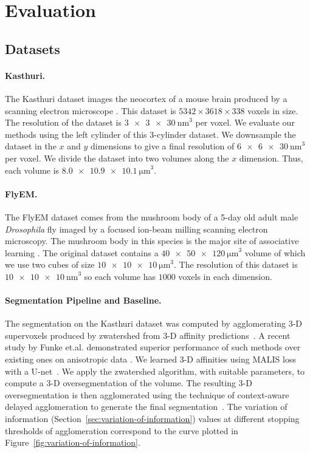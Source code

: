 \section{Evaluation}

\subsection{Datasets}
\label{sec:dataset}
\paragraph{Kasthuri.}
The Kasthuri dataset images the neocortex of a mouse brain produced by a scanning electron microscope \cite{kasthuri2015saturated}. 
This dataset is $5342 \times 3618 \times 338$ voxels in size. 
The resolution of the dataset is $\SI[product-units=single]{3 x 3 x 30}{\nano\meter}^3$ per voxel. 
We evaluate our methods using the left cylinder of this 3-cylinder dataset. 
We downsample the dataset in the $x$ and $y$ dimensions to give a final resolution of $\SI[product-units=single]{6 x 6 x 30}{\nano\meter}^3$ per voxel. 
We divide the dataset into two volumes along the $x$ dimension.
Thus, each volume is $\SI[product-units=single]{8.0 x 10.9 x 10.1}{\micro\meter}^3$. 

\paragraph{FlyEM.}
The FlyEM dataset comes from the mushroom body of a 5-day old adult male \textit{Drosophila} fly imaged by a focused ion-beam milling scanning electron microscopy.  
The mushroom body in this species is the major site of associative learning \cite{takemura2017connectome}. 
The original dataset contains a $\SI[product-units=single]{40 x 50 x 120}{\micro\meter}^3$ volume of which we use two cubes of size $\SI[product-units=single]{10 x 10 x 10}{\micro\meter}^3$. 
The resolution of this dataset is $\SI[product-units=single]{10 x 10 x 10}{\nano\meter}^3$ so each volume has $1000$ voxels in each dimension.

\paragraph{Segmentation Pipeline and Baseline.}
\label{sec:neuroproof}
The segmentation on the Kasthuri dataset was computed by agglomerating 3-D supervoxels produced by zwatershed from 3-D affinity predictions~\cite{zlateski2015image}. 
A recent study by Funke et.al. demonstrated superior performance of such methods over existing ones on anisotropic data \cite{schlegel2017learning}. 
We learned 3-D affinities using MALIS loss with a U-net~\cite{Turaga:2009,ronneberger2015u}. 
We apply the zwatershed algorithm, with suitable parameters, to compute a 3-D oversegmentation of the volume. 
The resulting 3-D oversegmentation is then agglomerated using the technique of context-aware delayed agglomeration to generate the final segmentation~\cite{10.1371/journal.pone.0125825}. 
The variation of information (Section~\ref{sec:variation-of-information}) values at different stopping thresholds of agglomeration correspond to the curve plotted in Figure~\ref{fig:variation-of-information}.

